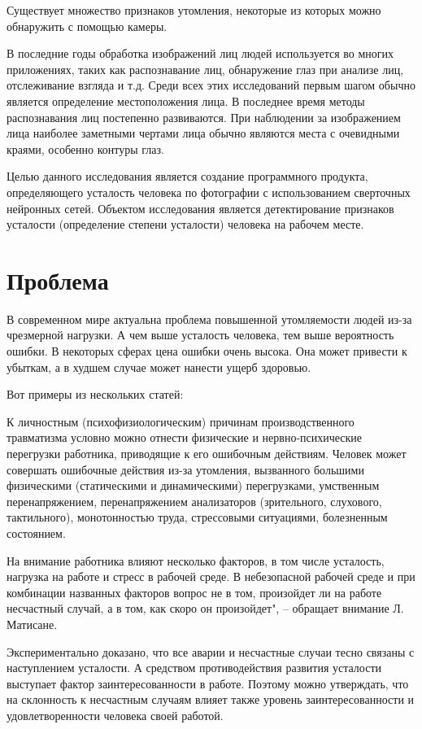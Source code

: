 \documentclass[12pt, letterpaper]{article}
\begin{document}
    Существует множество признаков утомления, некоторые из которых можно обнаружить с помощью камеры.

    В последние годы обработка изображений лиц людей используется во многих приложениях, таких как распознавание лиц, обнаружение глаз при анализе лиц, отслеживание взгляда и т.д.
    Среди всех этих исследований первым шагом обычно является определение местоположения лица.
    В последнее время методы распознавания лиц постепенно развиваются.
    При наблюдении за изображением лица наиболее заметными чертами лица обычно являются места с очевидными краями, особенно контуры глаз.

    Целью данного исследования является создание программного продукта, определяющего усталость человека по фотографии с использованием сверточных нейронных сетей.
    Объектом исследования является детектирование признаков усталости (определение степени усталости) человека на рабочем месте.

    \section{Проблема}\label{sec:problem}

    В современном мире актуальна проблема повышенной утомляемости людей из-за чрезмерной нагрузки.
    А чем выше усталость человека, тем выше вероятность ошибки.
    В некоторых сферах цена ошибки очень высока.
    Она может привести к убыткам, а в худшем случае может нанести ущерб здоровью.

    Вот примеры из нескольких статей:

    К личностным (психофизиологическим) причинам производственного травматизма условно можно отнести физические и нервно-психические перегрузки работника, приводящие к его ошибочным действиям.
    Человек может совершать ошибочные действия из-за утомления, вызванного большими физическими (статическими и динамическими) перегрузками, умственным перенапряжением, перенапряжением анализаторов (зрительного, слухового, тактильного), монотонностью труда, стрессовыми ситуациями, болезненным состоянием.

    На внимание работника влияют несколько факторов, в том числе усталость, нагрузка на работе и стресс в рабочей среде.
    В небезопасной рабочей среде и при комбинации названных факторов вопрос не в том, произойдет ли на работе несчастный случай, а в том, как скоро он произойдет", – обращает внимание Л. Матисане.

    Экспериментально доказано, что все аварии и несчастные случаи тесно связаны с наступлением усталости.
    А средством противодействия развития усталости выступает фактор заинтересованности в работе.
    Поэтому можно утверждать, что на склонность к несчастным случаям влияет также уровень заинтересованности и удовлетворенности человека своей работой.
\end{document}
